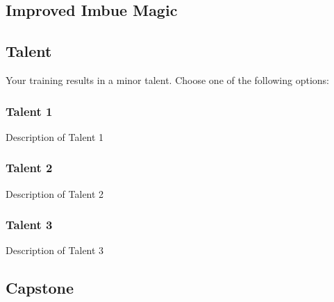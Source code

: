 \vspace{.1 in}

\subsection*{Improved Imbue Magic}
\lipsum[1]

\vspace{.1 in}

\subsection*{Talent}
Your training results in a minor talent. Choose one of the following options:

\subsubsection{Talent 1}
Description of Talent 1

\subsubsection{Talent 2}
Description of Talent 2

\subsubsection{Talent 3}
Description of Talent 3

\vspace{.1 in}

\subsection*{Capstone}
\lipsum[1]